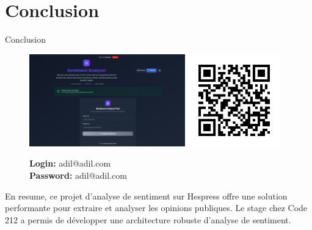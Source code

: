 \section{Conclusion}

\begin{frame}{Conclusion}
    \begin{figure}[H]
        \centering
        \begin{minipage}{0.4\textwidth}
            \centering
            \includegraphics[height=4cm]{assets/images/conclusion-ui.png}
        \end{minipage}
        \hfill
        \begin{minipage}{0.3\textwidth}
            \centering
            \includegraphics[height=4cm]{assets/images/qrcode.png}
        \end{minipage}
        \hfill
        \begin{minipage}{0.2\textwidth}
            \centering
            \vspace{1.5cm}
            \textbf{Login:} adil@adil.com \\
            \textbf{Password:} adil@adil.com
        \end{minipage}
    \end{figure}

    En resume, ce projet d'analyse de sentiment sur Hespress offre une solution performante pour extraire et analyser les opinions publiques. Le stage chez Code 212 a permis de développer une architecture robuste d'analyse de sentiment.
\end{frame}

